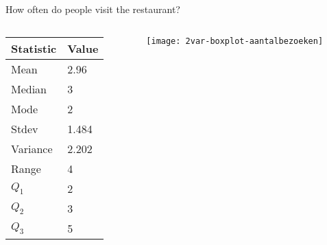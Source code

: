 \documentclass[aspectratio=169]{beamer}
\begin{document}
\begin{frame}{How often do people visit the restaurant?}
  \begin{columns}
    \begin{column}{0.5\textwidth}
      \begin{table}[h]
        \small
        \begin{tabular}{|l|l|}
          \hline
          { \textbf{Statistic}}  & \textbf{Value}  \\ \hline
          Mean                   & 2.96            \\ \hline
          Median                 & 3               \\ \hline
          Mode                   & 2               \\ \hline
          Stdev                  & 1.484           \\ \hline
          Variance               & 2.202           \\ \hline
          Range                  & 4               \\ \hline
          $Q_{1}$                & 2               \\ \hline
          $Q_{2}$                & 3               \\ \hline
          $Q_{3}$                & 5               \\ \hline
        \end{tabular}
      \end{table}
    \end{column}
    \begin{column}{0.5\textwidth}
      
      \begin{figure}
        \centering
        \texttt{[image: 2var-boxplot-aantalbezoeken]}
        \label{fig:boxplotStudenten}
      \end{figure}
      
    \end{column}
  \end{columns}
\end{frame}
\end{document}

